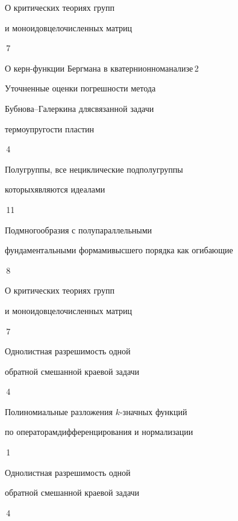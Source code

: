 

{О критических теориях групп


и моноидов\newline  целочисленных матриц}{\No\,7}




{О керн-функции Бергмана в кватернионном\newline анализе}{\No\,2}




{Уточненные оценки погрешности метода 


Бубнова--Галеркина для\newline связанной задачи 


термоупругости пластин}{\No\,4}




{Полугруппы, все нециклические подполугруппы 


которых\newline являются идеалами}{\No\,11}




{Подмногообразия с полупараллельными


фундаментальными формами\newline высшего порядка как огибающие}{\No\,8}




{О критических теориях групп


и моноидов\newline  целочисленных матриц}{\No\,7}




{Однолистная разрешимость одной \newline


обратной смешанной краевой задачи}{\No\,4}




{Полиномиальные разложения $k$-значных функций  


по операторам\newline дифференцирования и нормализации}{\No\,1}




{Однолистная разрешимость одной \newline


обратной смешанной краевой задачи}{\No\,4}



